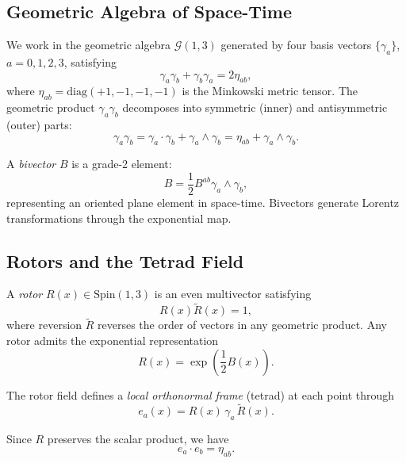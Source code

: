 \documentclass[11pt,a4paper]{article}
\numberwithin{equation}{section}
\theoremstyle{plain}
\theoremstyle{definition}
\theoremstyle{remark}
\begin{document}
\subsection{Geometric Algebra of Space-Time}

We work in the geometric algebra $\mathcal{G}(1,3)$ generated by four basis vectors $\{\gamma_a\}$, $a=0,1,2,3$, satisfying
\begin{equation}
\gamma_a \gamma_b + \gamma_b \gamma_a = 2\eta_{ab},
\end{equation}
where $\eta_{ab} = \mathrm{diag}(+1,-1,-1,-1)$ is the Minkowski metric tensor. The geometric product $\gamma_a\gamma_b$ decomposes into symmetric (inner) and antisymmetric (outer) parts:
\begin{equation}
\gamma_a\gamma_b = \gamma_a \cdot \gamma_b + \gamma_a \wedge \gamma_b = \eta_{ab} + \gamma_a \wedge \gamma_b.
\end{equation}

A \emph{bivector} $B$ is a grade-2 element:
\begin{equation}
B = \frac{1}{2}B^{ab}\gamma_a \wedge \gamma_b,
\end{equation}
representing an oriented plane element in space-time. Bivectors generate Lorentz transformations through the exponential map.

\subsection{Rotors and the Tetrad Field}

A \emph{rotor} $R(x) \in \mathrm{Spin}(1,3)$ is an even multivector satisfying
\begin{equation}
R(x)\widetilde{R}(x) = 1,
\end{equation}
where reversion $\widetilde{R}$ reverses the order of vectors in any geometric product. Any rotor admits the exponential representation
\begin{equation}
R(x) = \exp\left(\frac{1}{2}B(x)\right).
\label{eq:rotor-exp}
\end{equation}

The rotor field defines a \emph{local orthonormal frame} (tetrad) at each point through
\begin{equation}
e_a(x) = R(x)\, \gamma_a\, \widetilde{R}(x).
\label{eq:tetrad}
\end{equation}

Since $R$ preserves the scalar product, we have
\begin{equation}
e_a \cdot e_b = \eta_{ab}.
\end{equation}
\end{document}

